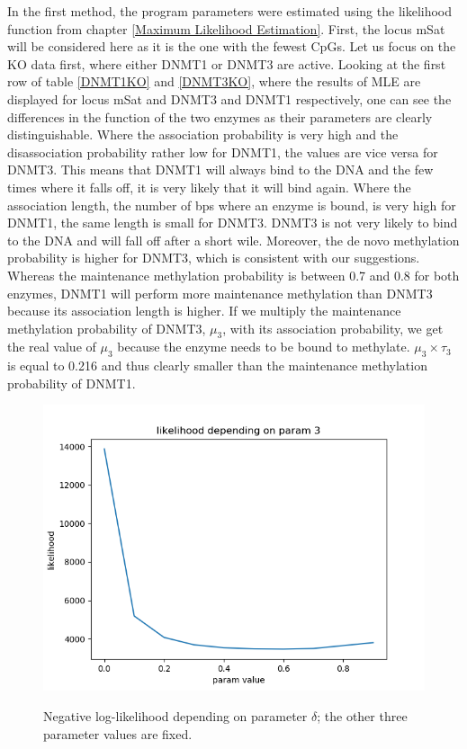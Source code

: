 In the first method, the program parameters were estimated using the likelihood function from chapter \ref{Maximum Likelihood Estimation}. First, the locus mSat will be considered here as it is the one with the fewest \acp{CpG}. Let us focus on the \ac{KO} data first, where either DNMT1 or DNMT3 are active. Looking at the first row of table \ref{DNMT1KO} and \ref{DNMT3KO}, where the results of \acf{MLE} are displayed for locus mSat and DNMT3 and DNMT1 respectively, one can see the differences in the function of the two enzymes as their parameters are clearly distinguishable. Where the association probability is very high and the disassociation probability rather low for DNMT1, the values are vice versa for DNMT3. This means that DNMT1 will always bind to the DNA and the few times where it falls off, it is very likely that it will bind again. Where the association length, the number of \acfp{bp} where an enzyme is bound, is very high for DNMT1, the same length is small for DNMT3. DNMT3 is not very likely to bind to the DNA and will fall off after a short wile. Moreover, the de novo methylation probability is higher for DNMT3, which is consistent with our suggestions. Whereas the maintenance methylation probability is between 0.7 and 0.8 for both enzymes, DNMT1 will perform more maintenance methylation than DNMT3 because its association length is higher. If we multiply the maintenance methylation probability of DNMT3, $\mu_3$, with its association probability, we get the real value of $\mu_3$ because the enzyme needs to be bound to methylate. $\mu_3 \times \tau_3$ is equal to 0.216 and thus clearly smaller than the maintenance methylation probability of DNMT1.\newline
\begin{figure}[h]
\includegraphics[scale=0.7]{../likelihoodPlot3DNMT3KO.png}
\label{rangedelta}
\caption{Negative log-likelihood depending on parameter $\delta$; the other three parameter values are fixed.}
\end{figure}
